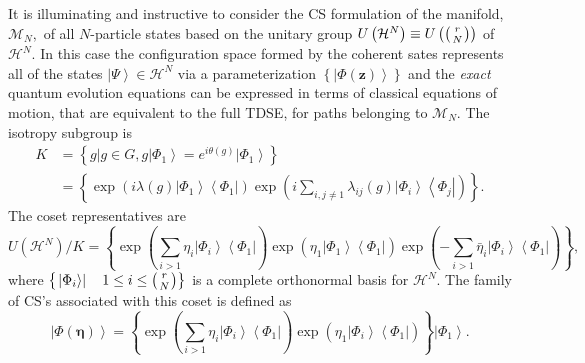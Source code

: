 \documentclass[12pt,aps,amsfonts,amssymb,tightenlines]{revtex4}%
\begin{document}
It is illuminating and instructive to consider the CS formulation of the
manifold, $\mathcal{M}_{N},$ of all $N$-particle states based on the unitary
group $U\left(  \mathcal{H}^{N}\right)  \equiv U\left(  \left(
\genfrac{}{}{0pt}{}{r}{N}%
\right)  \right)  $ of $\mathcal{H}^{N}.$ In this case the configuration space
formed by the coherent sates represents all of the states $\left\vert
\Psi\right\rangle \in\mathcal{H}^{N}$ via a parameterization $\left\{
\left\vert \Phi\left(  \mathbf{z}\right)  \right\rangle \right\}  $ and the
\emph{exact }quantum evolution equations can be expressed in terms of
classical equations of motion, that are equivalent to the full TDSE, for paths
belonging to $\mathcal{M}_{N}$. The isotropy subgroup is
\begin{align}
K  &  =\left\{  \left.  g\right\vert g\in G,g\left\vert \Phi_{1}\right\rangle
=e^{i\theta\left(  g\right)  }\left\vert \Phi_{1}\right\rangle \right\}
\nonumber\\
&  =\left\{  \exp\left(  i\lambda\left(  g\right)  \left\vert \Phi
_{1}\right\rangle \left\langle \Phi_{1}\right\vert \right)  \exp\left(
i\sum_{i,j\neq1}\lambda_{ij}\left(  g\right)  \left\vert \Phi_{i}\right\rangle
\left\langle \Phi_{j}\right\vert \right)  \right\}  .
\end{align}
The coset representatives are
\begin{equation}
U\left(  \mathcal{H}^{N}\right)  /K=\left\{  \exp\left(  \sum_{i>1}\eta
_{i}\left\vert \Phi_{i}\right\rangle \left\langle \Phi_{1}\right\vert \right)
\exp\left(  \eta_{1}\left\vert \Phi_{1}\right\rangle \left\langle \Phi
_{1}\right\vert \right)  \exp\left(  -\sum_{i>1}\bar{\eta}_{i}\left\vert
\Phi_{i}\right\rangle \left\langle \Phi_{1}\right\vert \right)  \right\}  ,
\end{equation}
where $\left\{  \left.  \left\vert \Phi_{i}\right\rangle \right\vert
\quad1\leq i\leq\left(
\genfrac{}{}{0pt}{}{r}{N}%
\right)  \right\}  $ is a complete orthonormal basis for $\mathcal{H}^{N}$.
The family of CS's associated with this coset is defined as
\begin{equation}
\left\vert \Phi\left(  \mathbf{\eta}\right)  \right\rangle =\left\{
\exp\left(  \sum_{i>1}\eta_{i}\left\vert \Phi_{i}\right\rangle \left\langle
\Phi_{1}\right\vert \right)  \exp\left(  \eta_{1}\left\vert \Phi
_{i}\right\rangle \left\langle \Phi_{1}\right\vert \right)  \right\}
\left\vert \Phi_{1}\right\rangle .
\end{equation}
\end{document}
